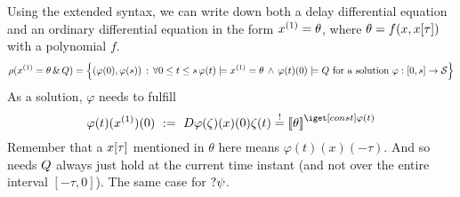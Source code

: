 
        Using the extended syntax, we can write down both a delay differential equation and an ordinary differential equation in the form $\D{x}=\theta$, where $\theta=f(x,x[\tau])$ with a polynomial $f$.
        \begin{equation}
            \iaccessibility(\hevolvein{\D{x}=\theta}{\ivr}) = \left\{
                (\varphi(0),\varphi(s))\,:\,\lforall{0\leq t\leq s}{\varphi(t)\models \D{x}=\theta\,\wedge\,\varphi(t)(0)\models\ivr}\text{ for a solution } \varphi:[0,s]\rightarrow\states \right\}
        \end{equation}
        As a solution, $\varphi$ needs to fulfill
        \begin{equation}
            \varphi(t)(\D{x})(0) \defeq \DD{\varphi(\zeta)(x)(0)}{\zeta}(t) \stackrel{!}{=} \imodel[]{\varphi(t)}{\theta}
        \end{equation}
        Remember that a $x[\tau]$ mentioned in $\theta$ here means $\varphi(t)(x)(-\tau)$.
        And so needs $Q$ always just hold at the current time instant (and not over the entire interval $[-\tau,0]$). The same case for $?\psi$.

